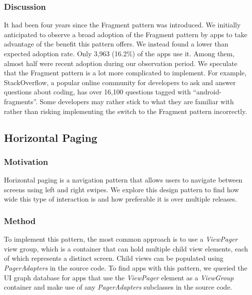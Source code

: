 \subsubsection{Discussion}
It had been four years since the Fragment pattern was introduced. 
We initially anticipated to observe a broad adoption of the Fragment pattern by apps to take advantage of the benefit this pattern offers. 
We instead found a lower than expected adoption rate. 
Only 3,963 (16.2\%) of the apps use it. 
Among them, almost half were recent adoption during our observation period. 
We speculate that the Fragment pattern is a lot more complicated to implement. 
For example,  StackOverflow, a popular online community for developers to ask and answer questions about coding, has over 16,100 questions tagged with ``android-fragments''. 
Some developers may rather stick to what they are familiar with rather than risking implementing the switch to the Fragment pattern incorrectly.

\subsection{Horizontal Paging}

\subsubsection{Motivation}
Horizontal paging is a navigation pattern that allows users to navigate between screens using left and right swipes. 
We explore this design pattern to find how wide this type of interaction is and how preferable it is over multiple releases.
\\
\subsubsection{Method}
To implement this pattern, the most common approach is to use a \textit{ViewPager} view group, which is a container that can hold multiple child view elements, each of which represents a distinct screen. 
Child views can be populated using \textit{PagerAdapters} in the source code. 
To find apps with this pattern, we queried the UI graph database for apps that use the \textit{ViewPager} element as a \textit{ViewGroup} container and make use of any \textit{PagerAdapters} subclasses in the source code.

